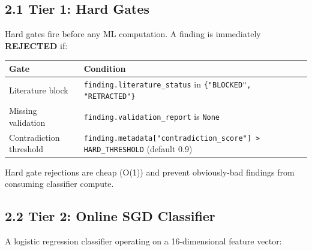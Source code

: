 \subsection*{2.1 Tier 1: Hard Gates}

Hard gates fire before any ML computation. A finding is immediately \textbf{REJECTED} if:

\begin{table}[h]
\small\centering
\begin{tabular}{ll}
\toprule
Gate & Condition \\
\midrule
Literature block & \texttt{finding.literature\_status} in \texttt{\{"BLOCKED", "RETRACTED"\}} \\
Missing validation & \texttt{finding.validation\_report} is \texttt{None} \\
Contradiction threshold & \texttt{finding.metadata["contradiction\_score"] > HARD\_THRESHOLD} (default 0.9) \\
\bottomrule
\end{tabular}
\end{table}


Hard gate rejections are cheap (O(1)) and prevent obviously-bad findings from consuming classifier compute.

\subsection*{2.2 Tier 2: Online SGD Classifier}

A logistic regression classifier operating on a 16-dimensional feature vector:

